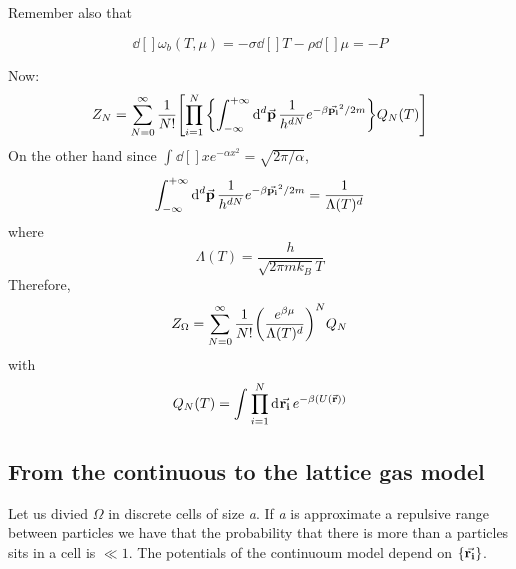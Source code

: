 \documentclass[../main/main.tex]{subfiles}
\begin{document}
Remember also that
\begin{redbox}
  \begin{equation}
  \dd[]{\omega _b (T, \mu )} = - \sigma \dd[]{T} - \rho  \dd[]{\mu } = - P
  \end{equation}
\end{redbox}
Now:
\begin{equation}
  Z_N = \sum_{N=0}^{\infty } \frac{1}{N!} \qty[\prod_{i=1}^{N}  \qty{ \int_{-\infty }^{+ \infty } \dd[d]{\va{p}} \frac{1}{h^{dN}} e^{-\beta \va{p_i}^2/2m}  } Q_N (T) ]
\end{equation}
On the other hand since \( \int_{}^{} \dd[]{x} e^{- \alpha x^2} = \sqrt{2 \pi / \alpha }    \),
\begin{equation}
  \int_{-\infty }^{+ \infty } \dd[d]{\va{p}} \frac{1}{h^{dN}} e^{-\beta \va{p_i}^2/2m} = \frac{1}{\Lambda (T)^d}
\end{equation}
where
\begin{equation}
  \Lambda ( T) = \frac{h}{\sqrt{2 \pi m k_B} T}
\end{equation}
Therefore,
\begin{equation}
  Z_ \Omega = \sum_{N=0}^{\infty } \frac{1}{N!} \qty(\frac{e^{\beta \mu } }{\Lambda (T)^d})^N Q_N
\end{equation}
with
\begin{equation}
  Q_N (T) = \int_{}^{} \prod_{i=1}^{N}  \dd[]{\va{r_i}}  e^{-\beta (U(\va{r}))}
\end{equation}


\subsection{From the continuous to the lattice gas model}
Let us divied \( \Omega  \) in discrete cells of size \emph{a}. If \emph{a} is approximate a repulsive range between particles we have that the probability that there is more than a particles sits in a cell is \( \ll 1 \). The potentials of the continuoum model depend on  \( \{ \va{r_i} \}   \).
\end{document}
